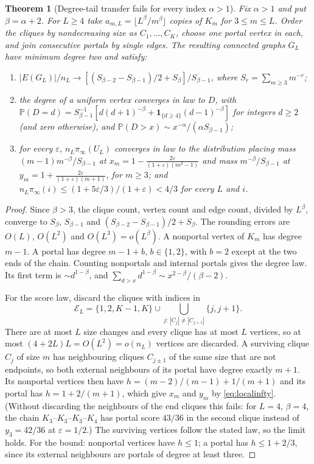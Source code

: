\documentclass[11pt,a4paper]{article}
\newtheorem{theorem}{Theorem}[section]
\theoremstyle{definition}\newtheorem{conjecture}{Conjecture}
\theoremstyle{remark}\newtheorem{remark}[theorem]{Remark}
\newcommand{\eps}{\varepsilon}
\begin{document}
\begin{theorem}[Degree-tail transfer fails for every index $\alpha>1$]\label{thm:tails}
Fix $\alpha>1$ and put $\beta=\alpha+2$. For $L\geq4$ take $a_{m,L}=\lfloor L^\beta/m^\beta\rfloor$ copies of $K_m$ for $3\leq m\leq L$. Order the cliques by nondecreasing size as $C_1,\dots,C_K$, choose one portal vertex in each, and join consecutive portals by single edges. The resulting connected graphs $G_L$ have minimum degree two and satisfy:
\begin{enumerate}
 \item $|E(G_L)|/n_L\to[(S_{\beta-2}-S_{\beta-1})/2+S_\beta]/S_{\beta-1}$, where $S_r=\sum_{m\geq3}m^{-r}$;
 \item the degree of a uniform vertex converges in law to $D$, with $\mathbb P(D=d)=S_{\beta-1}^{-1}[d(d+1)^{-\beta}+\mathbf 1_{\{d\geq4\}}(d-1)^{-\beta}]$ for integers $d\geq2$ (and zero otherwise), and $\mathbb P(D>x)\sim x^{-\alpha}/(\alpha S_{\beta-1})$;
 \item for every $\eps$, $n_L\pi_\infty(U_L)$ converges in law to the distribution placing mass $(m-1)m^{-\beta}/S_{\beta-1}$ at $x_m=1-\frac{2\eps}{(1+\eps)(m^2-1)}$ and mass $m^{-\beta}/S_{\beta-1}$ at $y_m=1+\frac{2\eps}{(1+\eps)(m+1)}$, for $m\geq3$; and $n_L\pi_\infty(i)\leq(1+5\eps/3)/(1+\eps)<4/3$ for every $L$ and $i$.
\end{enumerate}
\end{theorem}
\begin{proof}
Since $\beta>3$, the clique count, vertex count and edge count, divided by $L^\beta$, converge to $S_\beta$, $S_{\beta-1}$ and $(S_{\beta-2}-S_{\beta-1})/2+S_\beta$. The rounding errors are $O(L)$, $O(L^2)$ and $O(L^3)=o(L^\beta)$. A nonportal vertex of $K_m$ has degree $m-1$. A portal has degree $m-1+b$, $b\in\{1,2\}$, with $b=2$ except at the two ends of the chain. Counting nonportals and internal portals gives the degree law. Its first term is $\sim d^{1-\beta}$, and $\sum_{d>x}d^{1-\beta}\sim x^{2-\beta}/(\beta-2)$.

For the score law, discard the cliques with indices in
\[
 \mathcal E_L=\{1,2,K-1,K\}\cup\bigcup_{j:\,|C_j|\neq|C_{j+1}|}\{j,j+1\}.
\]
There are at most $L$ size changes and every clique has at most $L$ vertices, so at most $(4+2L)L=O(L^2)=o(n_L)$ vertices are discarded. A surviving clique $C_j$ of size $m$ has neighbouring cliques $C_{j\pm1}$ of the same size that are not endpoints, so both external neighbours of its portal have degree exactly $m+1$. Its nonportal vertices then have $h=(m-2)/(m-1)+1/(m+1)$ and its portal has $h=1+2/(m+1)$, which give $x_m$ and $y_m$ by \eqref{eq:localinfty}. (Without discarding the neighbours of the end cliques this fails: for $L=4$, $\beta=4$, the chain $K_3$--$K_3$--$K_3$--$K_4$ has portal score $43/36$ in the second clique instead of $y_3=42/36$ at $\eps=1/2$.) The surviving vertices follow the stated law, so the limit holds. For the bound: nonportal vertices have $h\leq1$; a portal has $h\leq1+2/3$, since its external neighbours are portals of degree at least three.
\end{proof}
\end{document}
